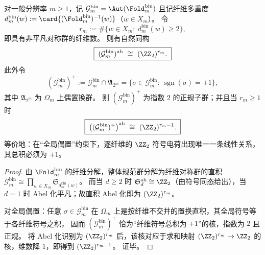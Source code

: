 \begin{enumerate}
  \begin{theorem}\label{thm:window6-foldbin-gauge-abelianization-even-parity}
  对一般分辨率 \(m\ge 1\)，记
  \(\mathcal{G}^{\mathrm{bin}}_m=\Aut(\Fold^{\mathrm{bin}}_m)\)
  且记纤维多重度 \(d^{\mathrm{bin}}_m(w):=\card{(\Fold^{\mathrm{bin}}_m)^{-1}(w)}\)（\(w\in X_m\)）。
  令
  \[
  r_m:=\#\{w\in X_m:\ d^{\mathrm{bin}}_m(w)\ge 2\},
  \]
  即具有非平凡对称群的纤维数。
  则有自然同构
  \[
  \boxed{\;(\mathcal{G}^{\mathrm{bin}}_m)^{\mathrm{ab}}\ \cong\ (\ZZ_2)^{r_m}.\;}
  \]
  此外令
  \[
  (\mathcal{G}^{\mathrm{bin}}_m)^{+}
  :=\mathcal{G}^{\mathrm{bin}}_m\cap \mathfrak{A}_{2^m}
  =\{\sigma\in\mathcal{G}^{\mathrm{bin}}_m:\ \operatorname{sgn}(\sigma)=+1\},
  \]
  其中 \(\mathfrak{A}_{2^m}\) 为 \(\Omega_m\) 上偶置换群。
  则 \((\mathcal{G}^{\mathrm{bin}}_m)^{+}\) 为指数 \(2\) 的正规子群；并且当 \(r_m\ge 1\) 时
  \[
  \boxed{\;\bigl((\mathcal{G}^{\mathrm{bin}}_m)^{+}\bigr)^{\mathrm{ab}}\ \cong\ (\ZZ_2)^{r_m-1}.\;}
  \]
  等价地：在“全局偶置”约束下，逐纤维的 \(\ZZ_2\) 符号电荷出现唯一一条线性关系，其总积必须为 \(+1\)。
  \end{theorem}

  \begin{proof}
  由 \(\Fold^{\mathrm{bin}}_m\) 的纤维分解，整体规范群分解为纤维对称群的直积
  \(
  \mathcal{G}^{\mathrm{bin}}_m\cong \prod_{w\in X_m}\mathfrak{S}_{d^{\mathrm{bin}}_m(w)}
  \)。
  而当 \(d\ge 2\) 时 \(\mathfrak{S}_d^{\mathrm{ab}}\cong \ZZ_2\)（由符号同态给出），当 \(d=1\) 时 Abel 化平凡；故直积 Abel 化即为 \((\ZZ_2)^{r_m}\)。
  \par
  对全局偶置：任意 \(\sigma\in\mathcal{G}^{\mathrm{bin}}_m\) 在 \(\Omega_m\) 上是按纤维不交并的置换直积，其全局符号等于各纤维符号之积，
  因而 \((\mathcal{G}^{\mathrm{bin}}_m)^{+}\) 恰为“纤维符号总积为 \(+1\)”的核，指数为 \(2\) 且正规。
  将 Abel 化识别为 \((\ZZ_2)^{r_m}\) 后，该核对应于求和映射 \((\ZZ_2)^{r_m}\to\ZZ_2\) 的核，维数降 \(1\)，即得到 \((\ZZ_2)^{r_m-1}\)。
  证毕。
  \end{proof}

  
  
  
  
  
  


\end{enumerate}
